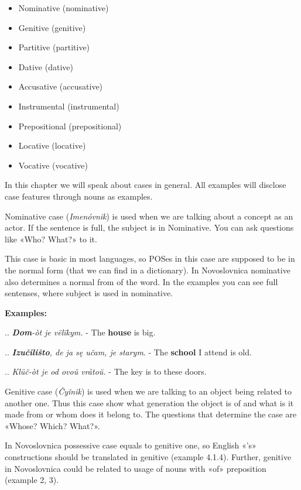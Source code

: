 \begin{itemize}
	\item Nominative (\gls{nominative})
	\item Genitive (\gls{genitive})
	\item Partitive (\gls{partitive})
	\item Dative (\gls{dative})
	\item Accusative (\gls{accusative})
	\item Instrumental (\gls{instrumental})
	\item Prepositional (\gls{prepositional})
	\item Locative (\gls{locative})
	\item Vocative (\gls{vocative})
\end{itemize}

In this chapter we will speak about cases in general. All examples will disclose case features through nouns as examples.

Nominative case (\textit{Imenóvnik}) is used when we are talking about a concept as an actor. If the sentence is full, the subject is in Nominative. You can ask questions like «Who? What?» to it.

This case is basic in most languages, so POSes in this case are supposed to be in the normal form (that we can find in a dictionary). In Novoslovnica nominative also determines a normal from of the word. In the examples you can see full sentenses, where subject is used in nominative.

\textbf{Examples:}

.. \textit{\textbf{Dom}-òt je vëlïkym.} - The \textbf{house} is big.

.. \textit{\textbf{Izučilišto}, de ja sę učam, je starym}. - The \textbf{school} I attend is old.

.. \textit{Klüč-òt je od ovoŭ vråtoŭ.} - The key is to these doors.

Genitive case (\textit{Čyǐnik}) is used when we are talking to an object being related to another one. Thus this case show what generation the object is of and what is it made from or whom does it belong to. The questions that determine the case are «Whose? Which? What?».

In Novoslovnica possessive case equals to genitive one, so English «'s» constructions should be translated in genitive (example 4.1.4). Further, genitive in Novoslovnica could be related to usage of nouns with «of» preposition (example 2, 3).

